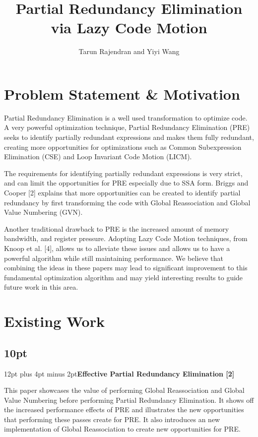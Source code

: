 \documentclass[onecolumn,10pt]{journal}
\author{Tarun Rajendran and Yiyi Wang}
\title{Partial Redundancy Elimination via Lazy Code Motion}
\begin{document}
\maketitle

\section{Problem Statement \& Motivation}
\indent Partial Redundancy Elimination is a well used transformation to optimize code. A very powerful optimization technique, Partial Redundancy Elimination (PRE) seeks to identify partially redundant expressions and makes them fully redundant, creating more opportunities for optimizations such as Common Subexpression Elimination (CSE) and Loop Invariant Code Motion (LICM).
    
    The requirements for identifying partially redundant expressions is very strict, and can limit the opportunities for PRE especially due to SSA form. Briggs and Cooper [2] explains that more opportunities can be created to identify  partial redundancy by first transforming the code with Global Reassociation and Global Value Numbering (GVN). 

    Another traditional drawback to PRE is the increased amount of memory bandwidth, and register pressure. Adopting Lazy Code Motion techniques, from Knoop et al. [4], allows us to alleviate these issues and allows us to have a powerful algorithm while still maintaining performance. We believe that combining the ideas in these papers may lead to significant improvement to this fundamental optimization algorithm and may yield interesting results to guide future work in this area.

\section{Existing Work}

\noindent\titlespacing\subsection*{10pt}{12pt plus 4pt minus 2pt}\textbf{Effective Partial Redundancy Elimination [2]}

\noindent This paper showcases the value of performing Global Reassociation and Global Value Numbering before performing Partial Redundancy Elimination. It shows off the increased performance effects of PRE and illustrates the new opportunities that performing these passes create for PRE. It also introduces an new implementation of Global Reassociation to create new opportunities for PRE. 
\end{document}
